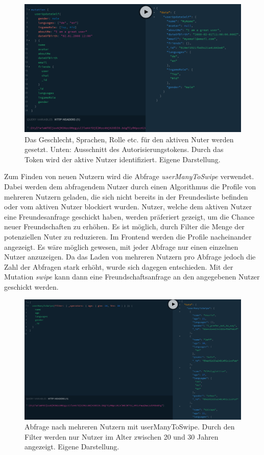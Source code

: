 \begin{figure}
	\centering
    \includegraphics[width=\textwidth]{sources/graphiql_userUpdateSelf.png}
	\caption{Das Geschlecht, Sprachen, Rolle etc. für den aktiven Nuter werden gesetzt. Unten: Ausschnitt des Autorisierungstokens. Durch das Token wird der aktive Nutzer identifiziert. Eigene Darstellung.}
	\label{fig:gql:4}
\end{figure}

Zum Finden von neuen Nutzern wird die Abfrage \textit{userManyToSwipe} verwendet. Dabei werden dem abfragendem Nutzer durch einen Algorithmus die Profile von mehreren Nutzern geladen, die sich nicht bereits in der Freundesliste befinden oder vom aktiven Nutzer blockiert wurden.
Nutzer, welche dem aktiven Nutzer eine Freundesanfrage geschickt haben, werden präferiert gezeigt, um die Chance neuer Freundschaften zu erhöhen.
Es ist möglich, durch Filter die Menge der potenziellen Nuter zu reduzieren.
Im Frontend werden die Profile nacheinander angezeigt.
Es wäre möglich gewesen,  mit jeder Abfrage nur einen einzelnen Nutzer anzuzeigen.
Da das Laden von mehreren Nutzern pro Abfrage jedoch die Zahl der Abfragen stark erhöht, wurde sich dagegen entschieden.
Mit der Mutation \textit{swipe} kann dann eine Freundschaftsanfrage an den angegebenen Nutzer geschickt werden.

\begin{figure}
	\centering
    \includegraphics[width=\textwidth]{sources/graphiql_userManyToSwipe.png}
	\caption{Abfrage nach mehreren Nutzern mit userManyToSwipe. Durch den Filter werden nur Nutzer im Alter zwischen 20 und 30 Jahren angezeigt. Eigene Darstellung.}
	\label{fig:gql:5}
\end{figure}

